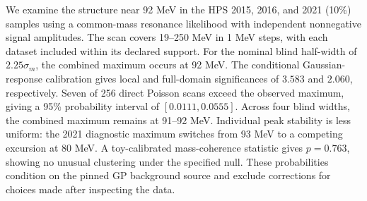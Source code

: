We examine the structure near 92 MeV in the HPS 2015, 2016, and 2021
(10\%) samples using a common-mass resonance likelihood with independent
nonnegative signal amplitudes. The scan covers 19--250 MeV in 1 MeV steps,
with each dataset included within its declared support. For the nominal
blind half-width of $2.25\sigma_m$, the combined maximum occurs at 92 MeV.
The conditional Gaussian-response calibration gives local and full-domain
significances of $3.583$ and $2.060$, respectively. Seven of 256 direct
Poisson scans exceed the observed maximum, giving a 95\% probability
interval of $[0.0111,0.0555]$. Across four blind widths, the combined
maximum remains at 91--92 MeV. Individual peak stability is less uniform:
the 2021 diagnostic maximum switches from 93 MeV to a competing excursion
at 80 MeV. A toy-calibrated mass-coherence statistic gives $p=0.763$,
showing no unusual clustering under the specified null. These probabilities
condition on the pinned GP background source and exclude corrections for
choices made after inspecting the data.
